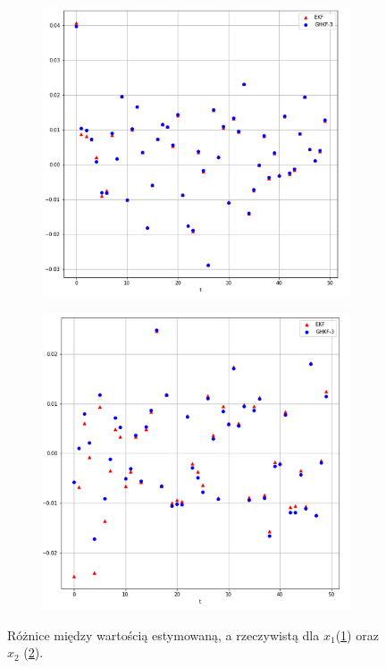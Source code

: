 \begin{figure}
	\centering
	\begin{subfigure}[b]{0.4\linewidth}
		\includegraphics[width=\linewidth]{Liu1_x1_error.png}
		\caption{}
		\label{fig:Liu1_errors_a}
	\end{subfigure}
	\begin{subfigure}[b]{0.4\linewidth}
		\includegraphics[width=\linewidth]{Liu1_x2_error.png}
		\caption{}
		\label{fig:Liu1_errors_b}
	\end{subfigure}
	\caption{Różnice między wartością estymowaną, a rzeczywistą dla $x_1$(\ref{fig:Liu1_errors_a}) oraz $x_2$ (\ref{fig:Liu1_errors_b}).}
	\label{fig:Liu1_errors}
\end{figure}


